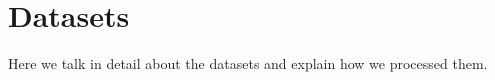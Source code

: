 \documentclass{article}
\begin{document}
\section{Datasets}
\label{section:datasets}

Here we talk in detail about the datasets and explain how we processed them.

\begin{figure}%
\centering
{}%
\hspace{8pt}%
 \\

\end{figure}
\end{document}
